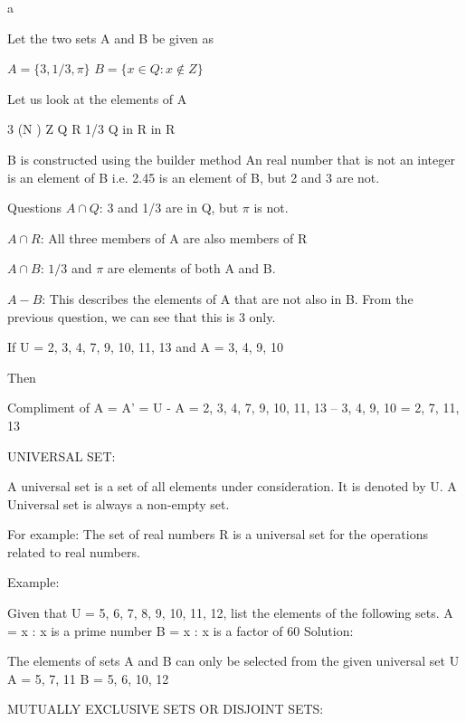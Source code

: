 \documentclass[a4paper,12pt]{article}
\begin{document}
a





Let the two sets A and B be given as

$ A =\{ 3, 1/3, \pi \}$
$ B =\{ x \in Q : x \notin Z   \}$

Let us look at the elements of A

3 (\in N ) \in Z \in Q \in R
1/3 \in  Q in R
\pi in R

B is constructed using the builder method
An real number that is not an integer is an element of B
i.e. 2.45 is an element of B, but 2 and 3 are not.

Questions
$A \cap Q$: 3 and 1/3 are in Q, but $\pi$ is not.

$A \cap R$: All three members of A are also members of R

$A \cap B$: $ 1/3$ and $\pi$ are elements of both A and B.

$A-B$: This describes the elements of A that are not also in B. From the previous question, we can see that this is 3 only.





If U = {2, 3, 4, 7, 9, 10, 11, 13} and A = {3, 4, 9, 10}

Then

Compliment of A = A’	 = U - A
= {2, 3, 4, 7, 9, 10, 11, 13} – {3, 4, 9, 10}
= {2, 7, 11, 13}

UNIVERSAL SET:

A universal set is a set of all elements under consideration. It is denoted by U. A Universal set is always a non-empty set.

For example: The set of real numbers R is a universal set for the operations related to real numbers.

Example:

Given that U = {5, 6, 7, 8, 9, 10, 11, 12}, list the elements of the following sets.
A = {x : x is a prime number}
B = {x : x is a factor of 60}
Solution:

The elements of sets A and B can only be selected from the given universal set U
A = {5, 7, 11}
B = {5, 6, 10, 12}

MUTUALLY EXCLUSIVE SETS OR DISJOINT SETS:
\end{document}
